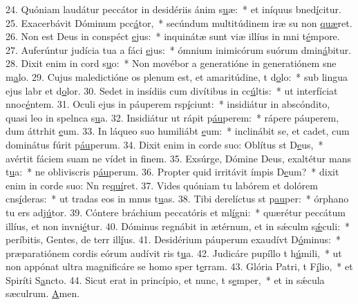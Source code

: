 24. Quóniam laudátur peccátor in desidériis ánim s\uline{u}æ:~* et iníquus bned\uline{í}citur.
25. Exacerbávit Dóminum pcc\uline{á}tor,~* secúndum multitúdinem iræ su non \uline{quæ}ret.
26. Non est Deus in conspéct \uline{e}jus:~* inquinátæ sunt viæ illíus in mni t\uline{é}mpore.
27. Auferúntur judícia tua a fáci \uline{e}jus:~* ómnium inimicórum suórum dmin\uline{á}bitur.
28. Dixit enim in cord s\uline{u}o:~* Non movébor a generatióne in generatiónem sne m\uline{a}lo.
29. Cujus maledictióne os plenum est, et amaritúdine, t d\uline{o}lo:~* sub lingua ejus labr et d\uline{o}lor.
30. Sedet in insídiis cum divítibus in cc\uline{ú}ltis:~* ut interfíciat nnoc\uline{é}ntem.
31. Oculi ejus in páuperem rsp\uline{í}ciunt:~* insidiátur in abscóndito, quasi leo in spelnca s\uline{u}a.
32. Insidiátur ut rápit p\uline{áu}perem:~* rápere páuperem, dum áttrhit \uline{e}um.
33. In láqueo suo humiliábt \uline{e}um:~* inclinábit se, et cadet, cum dominátus fúrit p\uline{áu}perum.
34. Dixit enim in corde suo: Oblítus st D\uline{e}us,~* avértit fáciem suam ne vídet in f\uline{i}nem.
35. Exsúrge, Dómine Deus, exaltétur mans t\uline{u}a:~* ne obliviscris p\uline{áu}perum.
36. Propter quid irritávit ímpis D\uline{e}um?~* dixit enim in corde suo: Nn re\uline{quí}ret.
37. Vides quóniam tu labórem et dolórem cns\uline{í}deras:~* ut tradas eos in mnus t\uline{u}as.
38. Tibi derelíctus st p\uline{au}per:~* órphano tu ers adj\uline{ú}tor.
39. Cóntere bráchium peccatóris et ml\uline{í}gni:~* quærétur peccátum illíus, et non invni\uline{é}tur.
40. Dóminus regnábit in ætérnum, et in sǽculm s\uline{ǽ}culi:~* períbitis, Gentes, de terr ill\uline{í}us.
41. Desidérium páuperum exaudívt D\uline{ó}minus:~* præparatiónem cordis eórum audívit ris t\uline{u}a.
42. Judicáre pupíllo t h\uline{ú}mili,~* ut non appónat ultra magnificáre se homo sper t\uline{e}rram.
43. Glória Patri, t F\uline{í}lio,~* et Spiríti S\uline{a}ncto.
44. Sicut erat in princípio, et nunc, t s\uline{e}mper,~* et in sǽcula sæculrum. \uline{A}men.
